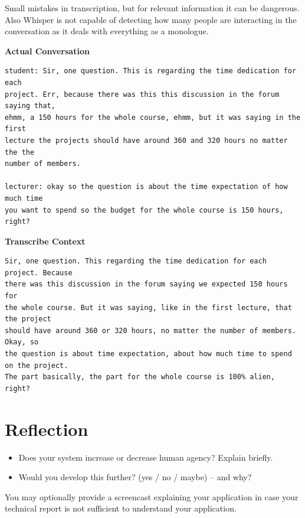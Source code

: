 \documentclass{article}
\begin{document}
Small mistakes in transcription, but for relevant information it can be dangerous.
Also Whisper is not capable of detecting how many people are interacting in the
conversation as it deals with everything as a monologue.

\textbf{Actual Conversation}
\begin{verbatim}
student: Sir, one question. This is regarding the time dedication for each 
project. Err, because there was this this discussion in the forum saying that,
ehmm, a 150 hours for the whole course, ehmm, but it was saying in the first 
lecture the projects should have around 360 and 320 hours no matter the the 
number of members.

lecturer: okay so the question is about the time expectation of how much time 
you want to spend so the budget for the whole course is 150 hours, right?
\end{verbatim}

\textbf{Transcribe Context}
\begin{verbatim}
Sir, one question. This regarding the time dedication for each project. Because
there was this discussion in the forum saying we expected 150 hours for 
the whole course. But it was saying, like in the first lecture, that the project
should have around 360 or 320 hours, no matter the number of members. Okay, so 
the question is about time expectation, about how much time to spend on the project.
The part basically, the part for the whole course is 100% alien, right?
\end{verbatim}


\section{Reflection}
\begin{itemize}
    \item Does your system increase or decrease human agency? Explain briefly.
    \item Would you develop this further? (yes / no / maybe) – and why?
\end{itemize}

You may optionally provide a screencast explaining your application in case your technical report is not sufficient to understand your application.
\end{document}
